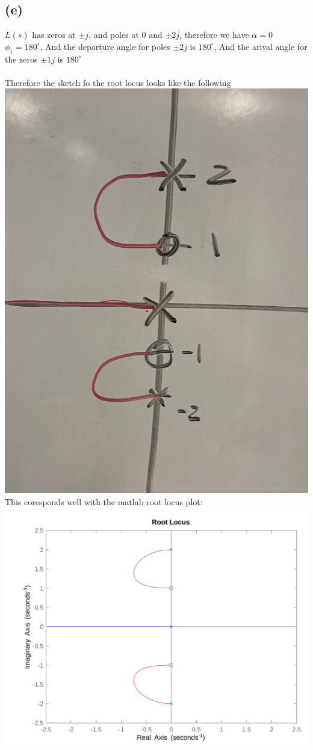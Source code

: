 \documentclass[12pt]{article}
\begin{document}
\subsection*{(e)}
$L(s)$ has zeros at $\pm j$, and poles at $0$ and $\pm2j$, therefore we have $\alpha=0$
$\phi_{1}=180^{\circ}$, 
And the departure angle for poles $\pm2j$ is $180^{\circ}$, And the arival angle for the zeros $\pm1j$ is $180^{\circ}$\\\\
Therefore the sketch fo the root locus looks like the following
\\
\includegraphics[scale=.15]{Problem1Sketch2.jpg}
\\This coresponds well with the matlab root locus plot:\\
\includegraphics[scale=.15]{Problem1Matlab2.png}
\end{document}
